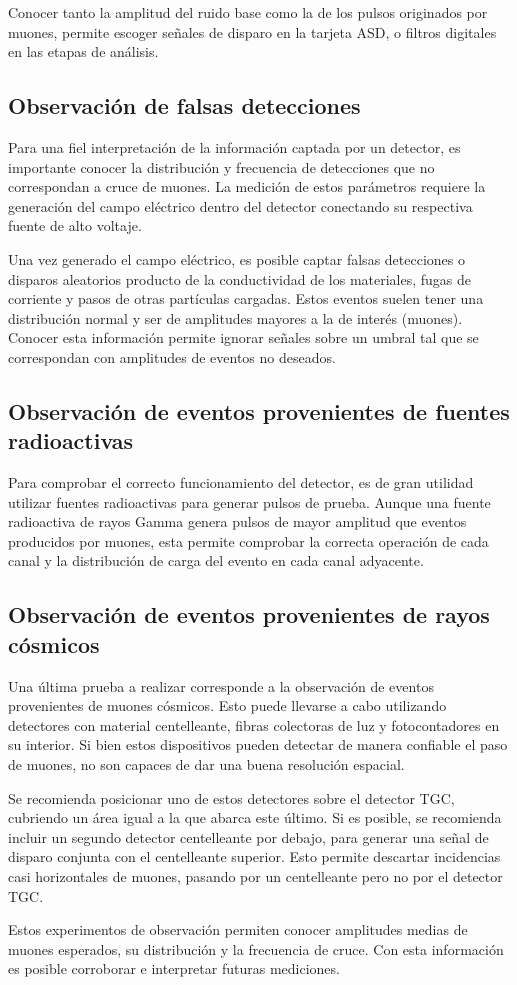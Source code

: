 		Conocer tanto la amplitud del ruido base como la de los pulsos originados por muones, permite escoger señales de disparo en la tarjeta ASD, o filtros digitales en las etapas de análisis. 
		
	\subsection{Observación de falsas detecciones}
		Para una fiel interpretación de la información captada por un detector, es importante conocer la distribución y frecuencia de detecciones que no correspondan a cruce de muones. La medición de estos parámetros requiere la generación del campo eléctrico dentro del detector conectando su respectiva fuente de alto voltaje.
		
		Una vez generado el campo eléctrico, es posible captar falsas detecciones o disparos aleatorios producto de la conductividad de los materiales, fugas de corriente y pasos de otras partículas cargadas. Estos eventos suelen tener una distribución normal y ser de amplitudes mayores a la de interés (muones). Conocer esta información permite ignorar señales sobre un umbral tal que se correspondan con amplitudes de eventos no deseados.
	
	\subsection{Observación de eventos provenientes de fuentes radioactivas}
		Para comprobar el correcto funcionamiento del detector, es de gran utilidad utilizar fuentes radioactivas para generar pulsos de prueba. Aunque una fuente radioactiva de rayos Gamma genera pulsos de mayor amplitud que eventos producidos por muones, esta permite comprobar la correcta operación de cada canal y la distribución de carga del evento en cada canal adyacente.
	
	\subsection{Observación de eventos provenientes de rayos cósmicos}
		Una última prueba a realizar corresponde a la observación de eventos provenientes de muones cósmicos. Esto puede llevarse a cabo utilizando detectores con material centelleante, fibras colectoras de luz y fotocontadores en su interior. Si bien estos dispositivos pueden detectar de manera confiable el paso de muones, no son capaces de dar una buena resolución espacial.
		
		Se recomienda posicionar uno de estos detectores sobre el detector TGC, cubriendo un área igual a la que abarca este último. Si es posible, se recomienda incluir un segundo detector centelleante por debajo, para generar una señal de disparo conjunta con el centelleante superior. Esto permite descartar incidencias casi horizontales de muones, pasando por un centelleante pero no por el detector TGC.
		
		Estos experimentos de observación permiten conocer amplitudes medias de muones esperados, su distribución y la frecuencia de cruce. Con esta información es posible corroborar e interpretar futuras mediciones.